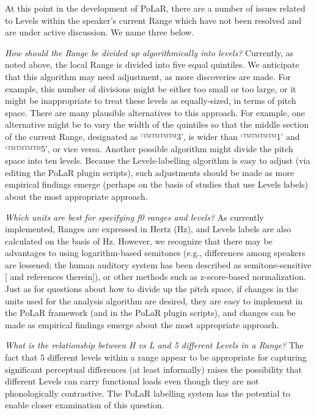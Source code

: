 \documentclass[11pt, twoside]{memoir}
\begin{document}
At this point in the development of PoLaR, there are a number of issues related to Levels within the speaker’s current Range which have not been resolved and are under active discussion.  We name three below.

\textit{How should the Range be divided up algorithmically into levels?} Currently, as noted above, the local Range is divided into five equal quintiles. We anticipate that this algorithm may need adjustment, as more discoveries are made. For example, this number of divisions might be either too small or too large, or it might be inappropriate to treat these levels as equally-sized, in terms of pitch space. There are many plausible alternatives to this approach. For example, one alternative might be to vary the width of the quintiles so that the middle section of the current Range, designated as ‘™™™™{3}’, is wider than ‘™™™™{1}’ and ‘™™™™{5}’, or vice versa. Another possible algorithm might divide the pitch space into ten levels. Because the Levels-labelling algorithm is easy to adjust (via editing the PoLaR plugin scripts), such adjustments should be made as more empirical findings emerge (perhaps on the basis of studies that use Levels labels) about the most appropriate approach.

\textit{Which units are best for specifying f0 ranges and levels?} As currently implemented, Ranges are expressed in Hertz (Hz), and Levels labels are also calculated on the basis of Hz. However, we recognize that there may be advantages to using logarithm-based semitones (e.g., differences among speakers are lessened; the human auditory system has been described as semitone-sensitive [\citealt{nolan03} and references therein]), or other methods such as z-score-based normalization. Just as for questions about how to divide up the pitch space, if changes in the units used for the analysis algorithm are desired, they are easy to implement in the PoLaR framework (and in the PoLaR plugin scripts), and changes can be made as empirical findings emerge about the most appropriate approach.

\textit{What is the relationship between H vs L and 5 different Levels in a Range?}  The fact that 5 different levels within a range appear to be appropriate for capturing significant perceptual differences (at least informally) raises the possibility that different Levels can carry functional loads even though they are not phonologically contrastive.  The PoLaR labelling system has the potential to enable closer examination of this question.
\end{document}

